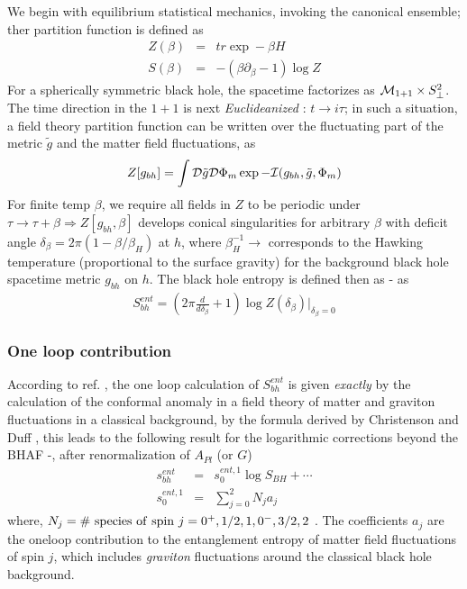 \documentclass[11pt]{article}
\begin{document}
{We begin with equilibrium statistical mechanics, invoking the canonical ensemble; ther partition function is defined as 
\begin{eqnarray}
Z(\beta) &=& tr \exp -\beta H \\
S(\beta) &=& -(\beta \partial_{\beta} -1) \log Z
\end{eqnarray}
For a spherically symmetric black hole, the spacetime factorizes as ${\cal M}_{1+1} \times S_{\perp}^2$. The time direction in the $1+1$ is next {\it Euclideanized} : $t \rightarrow i\tau$; in such a situation, a field theory partition function can be written over the fluctuating part of the metric ${\tilde g}$ and the matter field fluctuations, as 
\begin{eqnarray}
Z[g_{bh}] = \int {\cal D}{\tilde g} {\cal D} \Phi_m \exp - {\cal I}(g_{bh}, {\tilde g}, \Phi_m) 
\end{eqnarray}
\noindent For finite temp $\beta$, we require all fields in $Z$ to be periodic under $\tau \rightarrow \tau + \beta \Rightarrow Z[g_{bh}, \beta]$ develops conical singularities for arbitrary $\beta$ with deficit angle $\delta_{\beta} = 2\pi (1-\beta/\beta_H)$ at $h$, where $\beta_H^{-1} \rightarrow$ corresponds to the Hawking temperature (proportional to the surface gravity) for the background black hole spacetime metric $g_{bh}$ on $h$. The black hole entropy is defined then as \cite{cal1994}-\cite{sol2020} as 
\begin{eqnarray}
S_{bh}^{ent} = \left( 2\pi \frac{d}{d \delta_{\beta}} + 1 \right) \log Z(\delta_{\beta})|_{\delta_{\beta}=0} \label{enten}
\end{eqnarray}

\subsubsection{One loop contribution}

According to ref. \cite{sol2011}, the one loop calculation of $S^{ent}_{bh}$ is given {\it exactly} by the calculation of the conformal anomaly in a field theory of matter and graviton fluctuations in a classical background, by the formula derived by Christenson and Duff \cite{cd1978}, this leads to the following result for the logarithmic corrections beyond the BHAF \cite{sol2011}-\cite{sol2020}, after renormalization of $A_{Pl}$ (or $G$)
\begin{eqnarray}
s^{ent}_{bh} &=& s_0^{ent,1} \log S_{BH} + \cdots \nonumber \\
s_0^{ent,1} &=& \sum_{j=0}^{2} N_j a_j \label{1lp}
\end{eqnarray}
where, $N_j = \# ~{\rm species~of~spin}~ j=0^+,1/2,1,0^-,3/2,2~$. The coefficients $a_j$ are the oneloop contribution to the entanglement entropy of matter field fluctuations of spin $j$, which includes {\it graviton} fluctuations around the classical black hole background.

}
\end{document}
